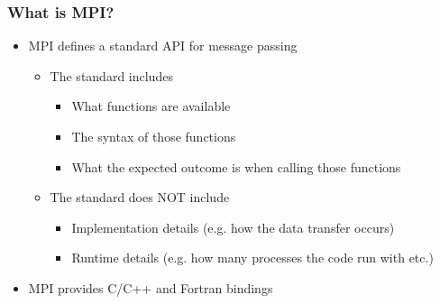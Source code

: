 \documentclass[10pt,t]{beamer}
\begin{document}
\begin{frame}
  \frametitle{What is MPI?}
  \begin{itemize}
    \item MPI defines a standard API for message passing
      \begin{itemize}
        \item The standard includes
          \begin{itemize}
          \item What functions are available
          \item The syntax of those functions
          \item What the expected outcome is when calling those functions
          \end{itemize}
        \item The standard does NOT include
          \begin{itemize}
            \item Implementation details (e.g. how the data transfer occurs)
            \item Runtime details (e.g. how many processes the code run with  etc.)
          \end{itemize}
      \end{itemize}
    \item MPI provides C/C++ and Fortran bindings
  \end{itemize}
\end{frame}
\end{document}
